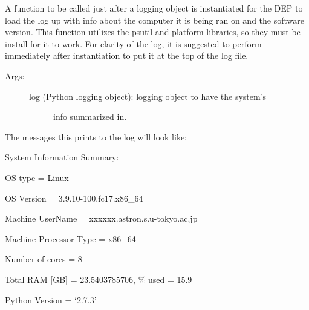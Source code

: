 \documentclass[letterpaper,10pt,english]{sphinxmanual}
\begin{document}

\begin{fulllineitems}
\label{tools:tools.initLogger.logFileProcessInfo}
\end{fulllineitems}


\begin{fulllineitems}
\label{tools:tools.initLogger.logSystemInfo}
A function to be called just after a logging object is instantiated 
for the DEP to load the log up with info about the computer it is 
being ran on and the software version.  This function utilizes the 
psutil and platform libraries, so they must be install for it to work.  
For clarity of the log, it is suggested to perform immediately after 
instantiation to put it at the top of the log file.
\begin{description}
\item[{Args:}] \leavevmode\begin{description}
\item[{log (Python logging object): logging object to have the system's }] \leavevmode
info summarized in.

\end{description}

\end{description}

The messages this prints to the log will look like:

\begin{DUlineblock}{0em}
\item[] System Information Summary:
\item[] OS type = Linux
\item[] OS Version = 3.9.10-100.fc17.x86\_64
\item[] Machine UserName = xxxxxx.astron.s.u-tokyo.ac.jp
\item[] Machine Processor Type = x86\_64
\item[] Number of cores = 8
\item[] Total RAM {[}GB{]} = 23.5403785706, \% used = 15.9
\item[] Python Version = `2.7.3'
\end{DUlineblock}

\end{fulllineitems}
\end{document}

